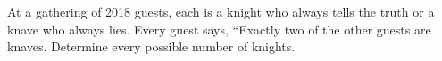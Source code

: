 At a gathering of 2018 guests, each is a knight who always tells the truth or a knave who always lies. Every guest says, ``Exactly two of the other guests are knaves. Determine every possible number of knights.
